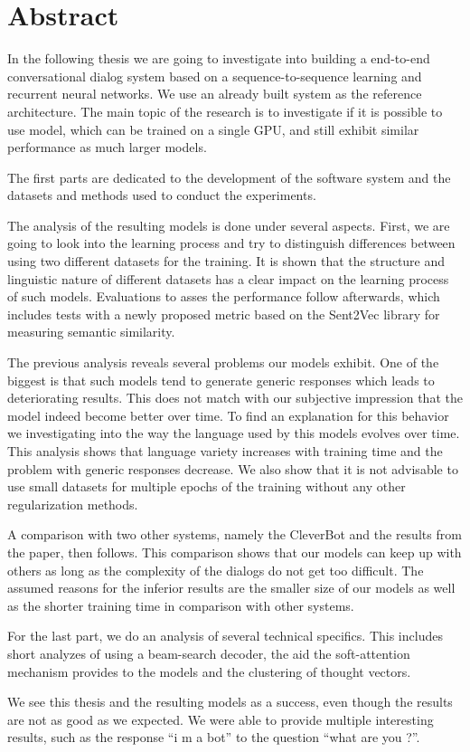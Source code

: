 \chapter*{Abstract}
In the following thesis we are going to investigate into building a end-to-end conversational dialog system based on a sequence-to-sequence learning and recurrent neural networks. We use an already built system as the reference architecture. The main topic of the research is to investigate if it is possible to use model, which can be trained on a single GPU, and still exhibit similar performance as much larger models.

The first parts are dedicated to the development of the software system and the datasets and methods used to conduct the experiments.

The analysis of the resulting models is done under several aspects. First, we are going to look into the learning process and try to distinguish differences between using two different datasets for the training. It is shown that the structure and linguistic nature of different datasets has a clear impact on the learning process of such models. Evaluations to asses the performance follow afterwards, which includes tests with a newly proposed metric based on the Sent2Vec library for measuring semantic similarity.

The previous analysis reveals several problems our models exhibit. One of the biggest is that such models tend to generate generic responses which leads to deteriorating results. This does not match with our subjective impression that the model indeed become better over time. To find an explanation for this behavior we investigating into the way the language used by this models evolves over time. This analysis shows that language variety increases with training time and the problem with generic responses decrease. We also show that it is not advisable to use small datasets for multiple epochs of the training without any other regularization methods.

A comparison with two other systems, namely the CleverBot and the results from the paper, then follows. This comparison shows that our models can keep up with others as long as the complexity of the dialogs do not get too difficult. The assumed reasons for the inferior results are the smaller size of our models as well as the shorter training time in comparison with other systems.

For the last part, we do an analysis of several technical specifics. This includes short analyzes of using a beam-search decoder, the aid the soft-attention mechanism provides to the models and the clustering of thought vectors. 

We see this thesis and the resulting models as a success, even though the results are not as good as we expected. We were able to provide multiple interesting results, such as the response ``i m a bot'' to the question ``what are you ?''.

